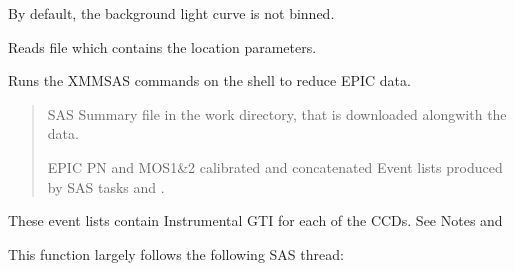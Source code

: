 \documentclass[letterpaper,10pt,english]{sphinxmanual}
\begin{document}
\begin{fulllineitems}
\begin{fulllineitems}
\sphinxAtStartPar
By default, the background light curve is not binned.

\end{fulllineitems}


\begin{fulllineitems}
\label{\detokenize{xmmPipeline:xmmPipeline.epicObj.epicObj.readCCDcoordsPickle}}
\pysigstartsignatures
{}
\pysigstopsignatures
\sphinxAtStartPar
Reads  file which contains the location parameters.

\end{fulllineitems}


\begin{fulllineitems}
\label{\detokenize{xmmPipeline:xmmPipeline.epicObj.epicObj.reduceEPICdata}}
\pysigstartsignatures
{}
\pysigstopsignatures
\sphinxAtStartPar
Runs the XMMSAS commands on the shell to reduce EPIC data.
\begin{quote}\begin{description}
\sphinxAtStartPar
SAS Summary file in the work directory, that is downloaded alongwith the data.

\sphinxAtStartPar
EPIC PN and MOS1\&2 calibrated and concatenated Event lists
produced by SAS tasks  and .

\end{description}\end{quote}

\sphinxAtStartPar
These event lists contain Instrumental GTI for each of the CCDs.
See Notes and 

\sphinxAtStartPar
This function largely follows the following SAS thread:

\end{fulllineitems}


\end{fulllineitems}
\end{document}

